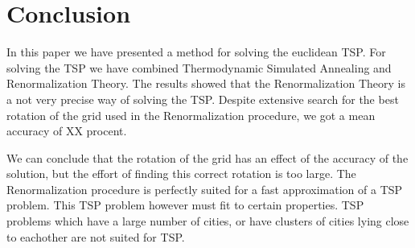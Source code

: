 \section{Conclusion}
In this paper we have presented a method for solving the euclidean TSP. For solving the TSP we have combined Thermodynamic Simulated Annealing and Renormalization Theory. The results showed that the Renormalization Theory is a not very precise way of solving the TSP. Despite extensive search for the best rotation of the grid used in the Renormalization procedure, we got a mean accuracy of XX procent.

We can conclude that the rotation of the grid has an effect of the accuracy of the solution, but the effort of finding this correct rotation is too large. The Renormalization procedure is perfectly suited for a fast approximation of a TSP problem. This TSP problem however must fit to certain properties. TSP problems which have a large number of cities, or have clusters of cities lying close to eachother are not suited for TSP.


